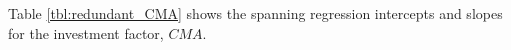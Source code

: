 
Table \ref{tbl:redundant_CMA} shows the spanning regression intercepts and slopes for the
investment factor, $CMA$.
